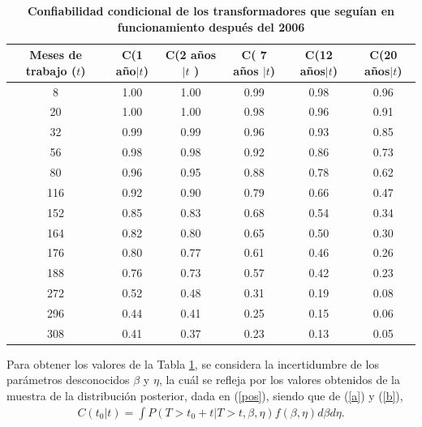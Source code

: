 \begin{table}[ht]\small
\begin{center}
\caption{\bf Confiabilidad condicional de los transformadores que segu\'ian en funcionamiento despu\'es del 2006}\label{ccc}
\vspace{.3cm}
\begin{tabular}{c|c|c|c|c|c}
\toprule[0.6mm]
 Meses de trabajo ($t$) & C(1 a\~no$|t$) &C(2 a\~nos$|t$ ) &C( 7  a\~nos $|t$) & C(12 a\~nos$|t$) & C(20 a\~nos$|t$) \\ 
\toprule[0.6mm]
  8& 1.00 & 1.00 & 0.99 & 0.98 & 0.96 \\ 
  20 & 1.00 & 1.00 & 0.98 & 0.96 & 0.91 \\ 
  32 & 0.99 & 0.99 & 0.96 & 0.93 & 0.85 \\ 
  56 & 0.98 & 0.98 & 0.92 & 0.86 & 0.73 \\ 
  80 & 0.96 & 0.95 & 0.88 & 0.78 & 0.62 \\ 
  116 & 0.92 & 0.90 & 0.79 & 0.66 & 0.47 \\ 
  152 & 0.85 & 0.83 & 0.68 & 0.54 & 0.34 \\ 
  164 & 0.82 & 0.80 & 0.65 & 0.50 & 0.30 \\ 
  176 & 0.80 & 0.77 & 0.61 & 0.46 & 0.26 \\ 
  188 & 0.76 & 0.73 & 0.57 & 0.42 & 0.23 \\ 
  272 & 0.52 & 0.48 & 0.31 & 0.19 & 0.08 \\ 
  296 & 0.44 & 0.41 & 0.25 & 0.15 & 0.06 \\ 
  308 & 0.41 & 0.37 & 0.23 & 0.13 & 0.05 \\ 
\bottomrule[0.6mm]
\end{tabular}\label{condicional}
\end{center}
\end{table}

\noindent Para obtener  los valores de la Tabla \ref{condicional}, se considera la incertidumbre de los par\'ametros desconocidos $\beta$ y $\eta$, la cu\'al se refleja por los valores obtenidos de la muestra de la distribuci\'on posterior, dada en (\ref{pos}), siendo que de (\ref{a}) y (\ref{b}), 
\begin{eqnarray*}
C(t_0|t)=\int P(T>t_0+t|T>t,\beta,\eta)f(\beta,\eta)d\beta d\eta.
\end{eqnarray*}


